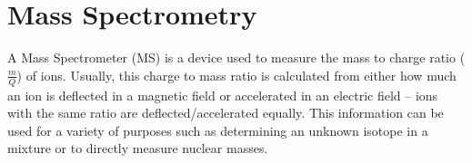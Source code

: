 \section{Mass Spectrometry}
A Mass Spectrometer (MS) is a device used to measure the mass to charge ratio ($\frac{m}{Q}$) of ions.
Usually, this charge to mass ratio is calculated from either how much an ion is deflected in a magnetic field or accelerated in an electric field – ions with the same ratio are deflected/accelerated equally.
This information can be used for a variety of purposes such as determining an unknown isotope in a mixture or to directly measure nuclear masses.